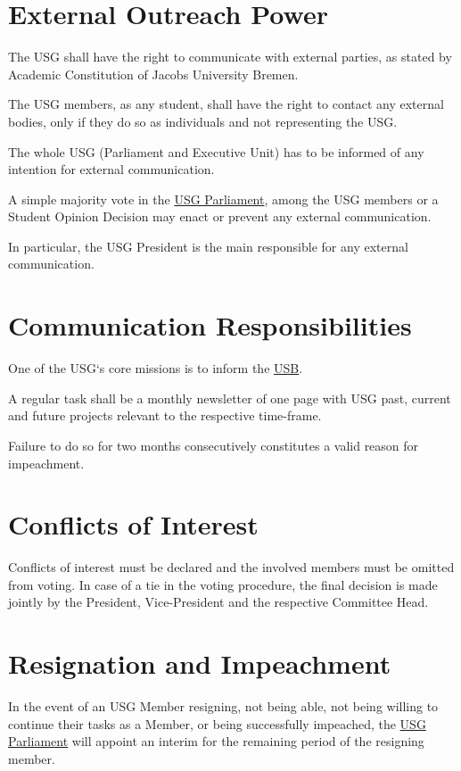 \section{External Outreach Power}
The USG shall have the right to communicate with external parties, as stated by Academic Constitution of Jacobs University Bremen. 
\begin{parenum}
\item The USG members, as any student, shall have the right to contact any external bodies, only if they do so as individuals and not representing the USG.
\item The whole USG (Parliament and Executive Unit) has to be informed of any intention for external communication.
\item A simple majority vote in the \hyperref[USGParliamentDef]{USG Parliament}, among the USG members or a Student Opinion Decision may enact or prevent any external communication.
\item In particular, the USG President is the main responsible for any external communication.
\end{parenum}

\section{Communication Responsibilities}
One of the USG`s core missions is to inform the \hyperref[studentbody]{USB}. 
\begin{parenum}
    \item A regular task shall be a monthly newsletter of one page with USG past, current and future projects relevant to the respective time-frame.
    \item Failure to do so for two months consecutively constitutes a valid reason for impeachment.
\end{parenum}

\section{Conflicts of Interest}
Conflicts of interest must be declared and the involved members must be omitted from voting. In case of a tie in the voting procedure, the final decision is made jointly by the President, Vice-President and the respective Committee Head.



\section{Resignation and Impeachment}
In the event of an USG Member resigning, not being able, not being willing to continue their tasks as a Member, or being successfully impeached, the \hyperref[USGParliamentDef]{USG Parliament} will appoint an interim for the remaining period of the resigning member.

